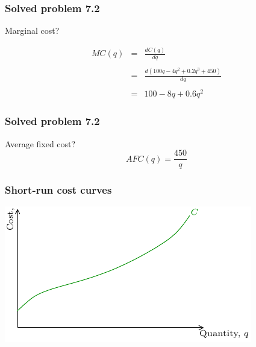 \documentclass[xcolor=pdftex,dvipsnames]{beamer}
\begin{document}
\begin{frame}
\frametitle{Solved problem 7.2}
Marginal cost?


\[\begin{array}{rcl}MC(q)& =& \frac{dC(q)}{dq}\\\\
&=& \frac{d(100q - 4q^2 + 0.2q^3 + 450)}{dq}\\\\
&=& 100 - 8q + 0.6q^2
\end{array}\]

\end{frame}

\begin{frame}
\frametitle{Solved problem 7.2}
Average fixed cost?
\[
AFC(q) = \frac{450}{q}
\]

\end{frame}


\begin{frame}
\frametitle{Short-run cost curves}
\begin{center}
\includegraphics{pics/ShortRunCC1}
\end{center}
\ \\
\
\end{frame}
\end{document}

